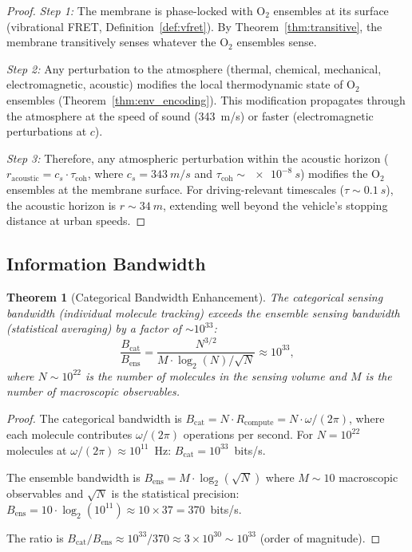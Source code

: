 \documentclass[12pt]{article}
\newtheorem{theorem}{Theorem}[section]
\theoremstyle{definition}
\theoremstyle{remark}
\newcommand{\Rcompute}{R_{\mathrm{compute}}}
\begin{document}
\begin{proof}
\emph{Step 1:} The membrane is phase-locked with $\mathrm{O}_2$ ensembles at its surface (vibrational FRET, Definition~\ref{def:vfret}). By Theorem~\ref{thm:transitive}, the membrane transitively senses whatever the $\mathrm{O}_2$ ensembles sense.

\emph{Step 2:} Any perturbation to the atmosphere (thermal, chemical, mechanical, electromagnetic, acoustic) modifies the local thermodynamic state of $\mathrm{O}_2$ ensembles (Theorem~\ref{thm:env_encoding}). This modification propagates through the atmosphere at the speed of sound (\SI{343}{m/s}) or faster (electromagnetic perturbations at $c$).

\emph{Step 3:} Therefore, any atmospheric perturbation within the acoustic horizon ($r_{\mathrm{acoustic}} = c_s \cdot \tau_{\mathrm{coh}}$, where $c_s = \SI{343}{m/s}$ and $\tau_{\mathrm{coh}} \sim \SI{e-8}{s}$) modifies the $\mathrm{O}_2$ ensembles at the membrane surface. For driving-relevant timescales ($\tau \sim \SI{0.1}{s}$), the acoustic horizon is $r \sim \SI{34}{m}$, extending well beyond the vehicle's stopping distance at urban speeds.
\end{proof}

\subsection{Information Bandwidth}

\begin{theorem}[Categorical Bandwidth Enhancement]
\label{thm:bandwidth}
The categorical sensing bandwidth (individual molecule tracking) exceeds the ensemble sensing bandwidth (statistical averaging) by a factor of $\sim 10^{33}$:
\begin{equation}
  \frac{B_{\mathrm{cat}}}{B_{\mathrm{ens}}} = \frac{N^{3/2}}{M \cdot \log_2(N)/\sqrt{N}} \approx 10^{33},
  \label{eq:bandwidth_ratio}
\end{equation}
where $N \sim 10^{22}$ is the number of molecules in the sensing volume and $M$ is the number of macroscopic observables.
\end{theorem}

\begin{proof}
The categorical bandwidth is $B_{\mathrm{cat}} = N \cdot \Rcompute = N \cdot \omega/(2\pi)$, where each molecule contributes $\omega/(2\pi)$ operations per second. For $N = 10^{22}$ molecules at $\omega/(2\pi) \approx 10^{11}$~Hz: $B_{\mathrm{cat}} = 10^{33}$~bits/s.

The ensemble bandwidth is $B_{\mathrm{ens}} = M \cdot \log_2(\sqrt{N})$ where $M \sim 10$ macroscopic observables and $\sqrt{N}$ is the statistical precision: $B_{\mathrm{ens}} = 10 \cdot \log_2(10^{11}) \approx 10 \times 37 = 370$~bits/s.

The ratio is $B_{\mathrm{cat}}/B_{\mathrm{ens}} \approx 10^{33}/370 \approx 3 \times 10^{30} \sim 10^{33}$ (order of magnitude).
\end{proof}
\end{document}
